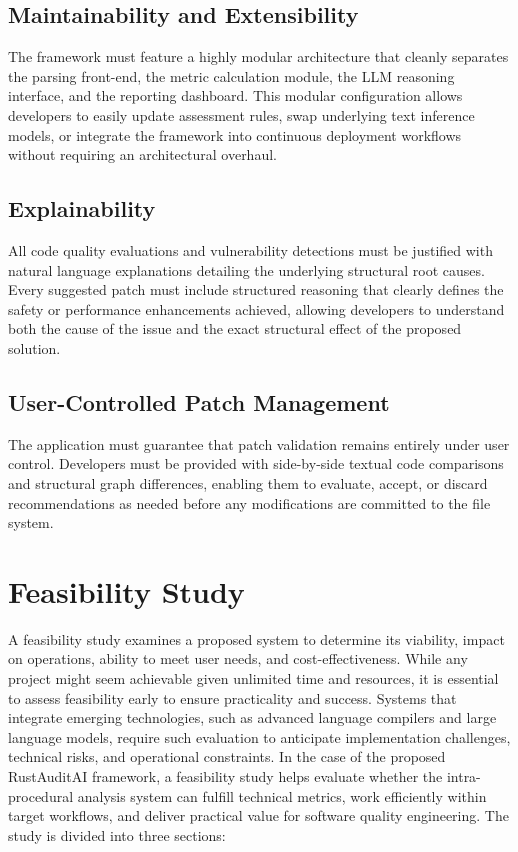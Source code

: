 \subsection{Maintainability and Extensibility}
\hspace{0.5cm}
The framework must feature a highly modular architecture that cleanly separates the parsing front-end, the metric calculation module, the LLM reasoning interface, and the reporting dashboard. This modular configuration allows developers to easily update assessment rules, swap underlying text inference models, or integrate the framework into continuous deployment workflows without requiring an architectural overhaul.

\subsection{Explainability}
All code quality evaluations and vulnerability detections must be justified with natural language explanations detailing the underlying structural root causes. Every suggested patch must include structured reasoning that clearly defines the safety or performance enhancements achieved, allowing developers to understand both the cause of the issue and the exact structural effect of the proposed solution.

\subsection{User-Controlled Patch Management}
The application must guarantee that patch validation remains entirely under user control. Developers must be provided with side-by-side textual code comparisons and structural graph differences, enabling them to evaluate, accept, or discard recommendations as needed before any modifications are committed to the file system.

\section{Feasibility Study}
\hspace{0.5cm}
A feasibility study examines a proposed system to determine its viability, impact on operations, ability to meet user needs, and cost-effectiveness. While any project might seem achievable given unlimited time and resources, it is essential to assess feasibility early to ensure practicality and success. Systems that integrate emerging technologies, such as advanced language compilers and large language models, require such evaluation to anticipate implementation challenges, technical risks, and operational constraints.
In the case of the proposed RustAuditAI framework, a feasibility study helps evaluate whether the intra-procedural analysis system can fulfill technical metrics, work efficiently within target workflows, and deliver practical value for software quality engineering. The study is divided into three sections:

